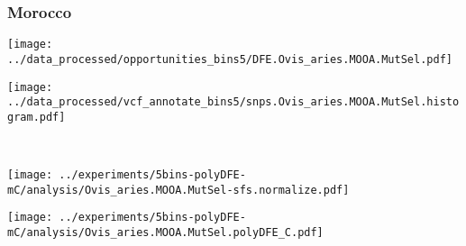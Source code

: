 \subsubsection{Morocco}

\begin{minipage}{0.49\linewidth}
    \texttt{[image: ../data\_processed/opportunities\_bins5/DFE.Ovis\_aries.MOOA.MutSel.pdf]}
\end{minipage}
\begin{minipage}{0.49\linewidth}
    \texttt{[image: ../data\_processed/vcf\_annotate\_bins5/snps.Ovis\_aries.MOOA.MutSel.histogram.pdf]}
\end{minipage}
\\
\begin{minipage}{0.49\linewidth}
    \texttt{[image: ../experiments/5bins-polyDFE-mC/analysis/Ovis\_aries.MOOA.MutSel-sfs.normalize.pdf]}
\end{minipage}
\begin{minipage}{0.49\linewidth}
    \texttt{[image: ../experiments/5bins-polyDFE-mC/analysis/Ovis\_aries.MOOA.MutSel.polyDFE\_C.pdf]}
\end{minipage}
\\ 
